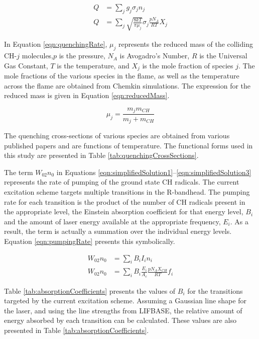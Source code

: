 \begin{align}
  Q & =\sum_j g_j \sigma_j n_j \nonumber \\
  Q & = \sum_j \sqrt{\frac{ 8kT }{ \pi\mu_j }} \sigma_j \frac{ pN_A }{ RT } X_j
  \label{eqn:quenchingRate}
\end{align}

In Equation \ref{eqn:quenchingRate}, \(\mu_j\) represents the reduced mass of the colliding CH-\(j\) molecules,\(p\) is the pressure, \(N_A\) is Avogadro's Number, \(R\) is the Universal Gas Constant, \(T\) is the temperature, and \(X_j\) is the mole fraction of species \(j\).
The mole fractions of the various species in the flame, as well as the temperature across the flame are obtained from Chemkin simulations.
The expression for the reduced mass is given in Equation \ref{eqn:reducedMass}.

\begin{equation}
  \mu_j = \frac{ m_j m_{CH} }{ m_j + m_{CH} }
  \label{eqn:reducedMass}
\end{equation}

The quenching cross-sections of various species are obtained from various published papers\cite{1994-chen,1998-tamura,2002-renfro} and are functions of temperature.
The functional forms used in this study are presented in Table \ref{tab:quenchingCrossSections}.



The term \(W_{02}n_0\) in Equations \ref{eqn:simplifiedSolution1}--\ref{eqn:simplifiedSolution3} represents the rate of pumping of the ground state CH radicals.
The current excitation scheme targets multiple transitions in the R-bandhead.
The pumping rate for each transition is the product of the number of CH radicals present in the appropriate level, the Einstein absorption coefficient for that energy level, \(B_i\) and the amount of laser energy available at the appropriate frequency, \(E_i\).
As a result, the term is actually a summation over the individual energy levels.
Equation \ref{eqn:pumpingRate} presents this symbolically.

\begin{align}
  W_{02}n_0 &= \sum_i B_i I_i n_i \nonumber \\
  W_{02}n_0 &= \sum_i B_i \frac{ E_i }{ A_c } \frac{ pN_A X_{CH} }{ RT } f_i
  \label{eqn:pumpingRate}
\end{align}

Table \ref{tab:absorptionCoefficients} presents the values of \(B_i\) for the transitions targeted by the current excitation scheme.\cite{1996-luque-c}
Assuming a Gaussian line shape for the laser, and using the line strengths from LIFBASE, the relative amount of energy absorbed by each transition can be calculated.
These values are also presented in Table \ref{tab:absorptionCoefficients}.

